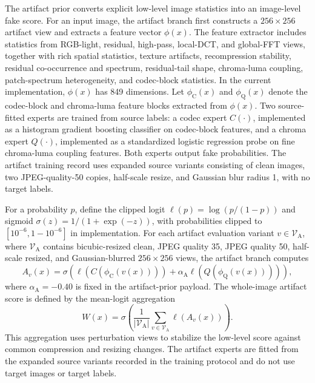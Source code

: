 \documentclass[letterpaper,journal]{IEEEtran}
\begin{document}
The artifact prior converts explicit low-level image statistics into an image-level fake score. For an input image, the artifact branch first constructs a $256 \times 256$ artifact view and extracts a feature vector $\phi(x)$. The feature extractor includes statistics from RGB-light, residual, high-pass, local-DCT, and global-FFT views, together with rich spatial statistics, texture artifacts, recompression stability, residual co-occurrence and spectrum, residual-tail shape, chroma-luma coupling, patch-spectrum heterogeneity, and codec-block statistics. In the current implementation, $\phi(x)$ has 849 dimensions. Let $\phi_{\mathrm{C}}(x)$ and $\phi_{\mathrm{Q}}(x)$ denote the codec-block and chroma-luma feature blocks extracted from $\phi(x)$. Two source-fitted experts are trained from source labels: a codec expert $C(\cdot)$, implemented as a histogram gradient boosting classifier on codec-block features, and a chroma expert $Q(\cdot)$, implemented as a standardized logistic regression probe on fine chroma-luma coupling features. Both experts output fake probabilities. The artifact training record uses expanded source variants consisting of clean images, two JPEG-quality-50 copies, half-scale resize, and Gaussian blur radius 1, with no target labels.

For a probability $p$, define the clipped logit $\ell(p)=\log(p/(1-p))$ and sigmoid $\sigma(z)=1/(1+\exp(-z))$, with probabilities clipped to $[10^{-6},1-10^{-6}]$ in implementation. For each artifact evaluation variant $v \in \mathcal{V}_{\mathrm{A}}$, where $\mathcal{V}_{\mathrm{A}}$ contains bicubic-resized clean, JPEG quality 35, JPEG quality 50, half-scale resized, and Gaussian-blurred $256 \times 256$ views, the artifact branch computes
\[
    A_v(x)=\sigma\left(\ell(C(\phi_{\mathrm{C}}(v(x))))+\alpha_{\mathrm{A}} \ell(Q(\phi_{\mathrm{Q}}(v(x))))\right),
\]
where $\alpha_{\mathrm{A}}=-0.40$ is fixed in the artifact-prior payload. The whole-image artifact score is defined by the mean-logit aggregation
\[
    W(x)=\sigma\left(\frac{1}{|\mathcal{V}_{\mathrm{A}}|}\sum_{v\in\mathcal{V}_{\mathrm{A}}}\ell(A_v(x))\right).
\]
This aggregation uses perturbation views to stabilize the low-level score against common compression and resizing changes. The artifact experts are fitted from the expanded source variants recorded in the training protocol and do not use target images or target labels.
\end{document}
